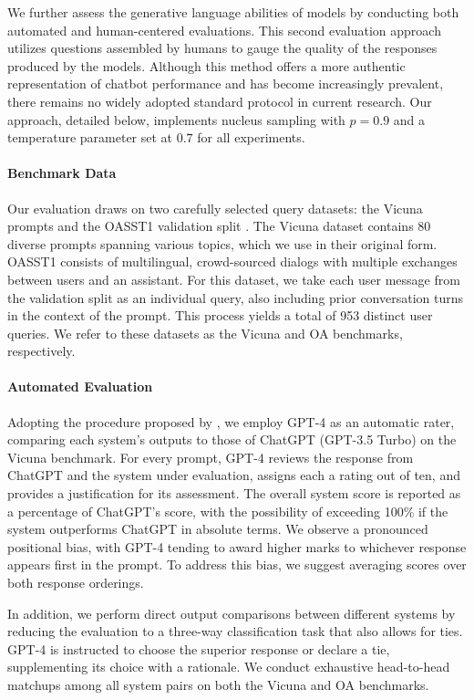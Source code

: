 We further assess the generative language abilities of models by conducting both automated and human-centered evaluations. This second evaluation approach utilizes questions assembled by humans to gauge the quality of the responses produced by the models. Although this method offers a more authentic representation of chatbot performance and has become increasingly prevalent, there remains no widely adopted standard protocol in current research. Our approach, detailed below, implements nucleus sampling with $p=0.9$ and a temperature parameter set at $0.7$ for all experiments.

\paragraph{Benchmark Data} Our evaluation draws on two carefully selected query datasets: the Vicuna prompts \citep{vicuna2023} and the OASST1 validation split \citep{kopf2023openassistant}. The Vicuna dataset contains 80 diverse prompts spanning various topics, which we use in their original form. OASST1 consists of multilingual, crowd-sourced dialogs with multiple exchanges between users and an assistant. For this dataset, we take each user message from the validation split as an individual query, also including prior conversation turns in the context of the prompt. This process yields a total of 953 distinct user queries. We refer to these datasets as the Vicuna and OA benchmarks, respectively.

\paragraph{Automated Evaluation} Adopting the procedure proposed by \citet{vicuna2023}, we employ GPT-4 as an automatic rater, comparing each system’s outputs to those of ChatGPT (GPT-3.5 Turbo) on the Vicuna benchmark. For every prompt, GPT-4 reviews the response from ChatGPT and the system under evaluation, assigns each a rating out of ten, and provides a justification for its assessment. The overall system score is reported as a percentage of ChatGPT’s score, with the possibility of exceeding 100\% if the system outperforms ChatGPT in absolute terms. We observe a pronounced positional bias, with GPT-4 tending to award higher marks to whichever response appears first in the prompt. To address this bias, we suggest averaging scores over both response orderings.

In addition, we perform direct output comparisons between different systems by reducing the evaluation to a three-way classification task that also allows for ties. GPT-4 is instructed to choose the superior response or declare a tie, supplementing its choice with a rationale. We conduct exhaustive head-to-head matchups among all system pairs on both the Vicuna and OA benchmarks.

